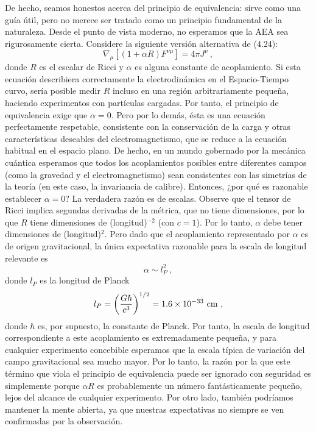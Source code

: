 \documentclass[11pt,b5paper,openany,twoside]{book}
\begin{document}
De hecho, seamos honestos acerca del principio de equivalencia: sirve como una guía útil, pero no merece ser tratado como un principio fundamental de la naturaleza.
Desde el punto de vista moderno, no esperamos que la AEA sea rigurosamente cierta.
Considere la siguiente versión alternativa de (4.24):
\begin{equation}
\nabla_\mu[(1+\alpha R)F^{\nu\mu}] = 4\pi J^\nu\ ,\label{4.32}
\end{equation}
donde $R$ es el escalar de Ricci y $\alpha$ es alguna constante de acoplamiento.
Si esta ecuación describiera correctamente la electrodinámica en el Espacio-Tiempo curvo, sería posible medir $R$ incluso en una región arbitrariamente pequeña, haciendo experimentos con partículas cargadas.
Por tanto, el principio de equivalencia exige que $\alpha=0$.
Pero por lo demás, ésta es una ecuación perfectamente respetable, consistente con la conservación de la carga y otras características deseables del electromagnetismo, que se reduce a la ecuación habitual en el espacio plano.
De hecho, en un mundo gobernado por la mecánica cuántica esperamos que todos los acoplamientos posibles entre diferentes campos (como la gravedad y el electromagnetismo) sean consistentes con las simetrías de la teoría (en este caso, la invariancia de calibre).
Entonces, ¿por qué es razonable establecer $\alpha=0$? La verdadera razón es de escalas.
Observe que el tensor de Ricci implica segundas derivadas de la métrica, que no tiene dimensiones, por lo que $R$ tiene dimensiones de (longitud)$^{-2}$ (con $c=1$).
Por lo tanto, $\alpha$ debe tener dimensiones de (longitud)$^{2}$.
Pero dado que el acoplamiento representado por $\alpha$ es de origen gravitacional, la única expectativa razonable para la escala de longitud relevante es
\begin{equation}
\alpha \sim l_P^2\ ,\label{4.33}
\end{equation}
donde $l_P$ es la longitud de Planck
\begin{equation}
l_P = \left({{G\hbar}\over{c^3}}\right)^{1/2}=1.6\times
10^{-33}{\rm ~cm}\ ,\label{4.34}
\end{equation}
donde $\hbar$ es, por supuesto, la constante de Planck.
Por tanto, la escala de longitud correspondiente a este acoplamiento es extremadamente pequeña, y para cualquier experimento concebible esperamos que la escala típica de variación del campo gravitacional sea mucho mayor.
Por lo tanto, la razón por la que este término que viola el principio de equivalencia puede ser ignorado con seguridad es simplemente porque $\alpha R$ es probablemente un número fantásticamente pequeño, lejos del alcance de cualquier experimento.
Por otro lado, también podríamos mantener la mente abierta, ya que nuestras expectativas no siempre se ven confirmadas por la observación.
\end{document}
